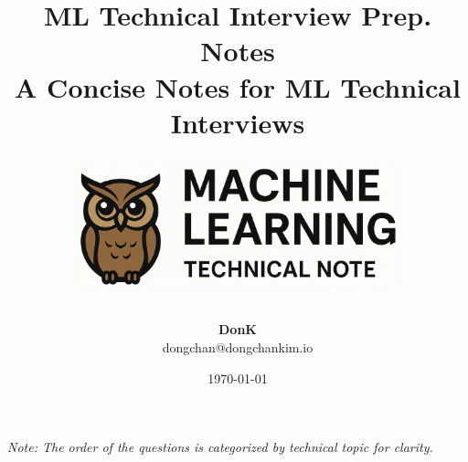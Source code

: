 \documentclass[11pt]{article}
\title{
  \vspace{1cm}
  \Huge\textbf{ML Technical Interview Prep. Notes} \\
  \vspace{0.5cm}
  \large A Concise Notes for ML Technical Interviews \\
  \vspace{5cm}
  \begin{center}
    \includegraphics[width=0.7\textwidth]{p_logo.png}
  \end{center}
  \vspace{5cm}
}
\author{\textbf{DonK} \\
\small dongchan@dongchankim.io}
\date{\today}
\begin{document}
\begin{titlepage}
	\maketitle
	\thispagestyle{empty}
	\vspace*{\fill}
	\small\textit{Note: The order of the questions is categorized by technical topic for clarity.}
\end{titlepage}

\tableofcontents
\thispagestyle{empty}
\newpage

\end{document}
